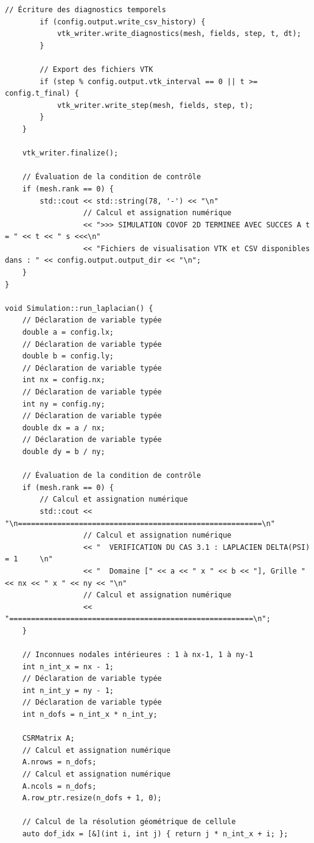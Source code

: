 \documentclass[10pt,a4paper,oneside]{book}
\begin{document}
\begin{lstlisting}[language={[11]C++}]
        // Écriture des diagnostics temporels
        if (config.output.write_csv_history) {
            vtk_writer.write_diagnostics(mesh, fields, step, t, dt);
        }

        // Export des fichiers VTK
        if (step % config.output.vtk_interval == 0 || t >= config.t_final) {
            vtk_writer.write_step(mesh, fields, step, t);
        }
    }

    vtk_writer.finalize();

    // Évaluation de la condition de contrôle
    if (mesh.rank == 0) {
        std::cout << std::string(78, '-') << "\n"
                  // Calcul et assignation numérique
                  << ">>> SIMULATION COVOF 2D TERMINEE AVEC SUCCES A t = " << t << " s <<<\n"
                  << "Fichiers de visualisation VTK et CSV disponibles dans : " << config.output.output_dir << "\n";
    }
}

void Simulation::run_laplacian() {
    // Déclaration de variable typée
    double a = config.lx;
    // Déclaration de variable typée
    double b = config.ly;
    // Déclaration de variable typée
    int nx = config.nx;
    // Déclaration de variable typée
    int ny = config.ny;
    // Déclaration de variable typée
    double dx = a / nx;
    // Déclaration de variable typée
    double dy = b / ny;

    // Évaluation de la condition de contrôle
    if (mesh.rank == 0) {
        // Calcul et assignation numérique
        std::cout << "\n========================================================\n"
                  // Calcul et assignation numérique
                  << "  VERIFICATION DU CAS 3.1 : LAPLACIEN DELTA(PSI) = 1     \n"
                  << "  Domaine [" << a << " x " << b << "], Grille " << nx << " x " << ny << "\n"
                  // Calcul et assignation numérique
                  << "========================================================\n";
    }

    // Inconnues nodales intérieures : 1 à nx-1, 1 à ny-1
    int n_int_x = nx - 1;
    // Déclaration de variable typée
    int n_int_y = ny - 1;
    // Déclaration de variable typée
    int n_dofs = n_int_x * n_int_y;

    CSRMatrix A;
    // Calcul et assignation numérique
    A.nrows = n_dofs;
    // Calcul et assignation numérique
    A.ncols = n_dofs;
    A.row_ptr.resize(n_dofs + 1, 0);

    // Calcul de la résolution géométrique de cellule
    auto dof_idx = [&](int i, int j) { return j * n_int_x + i; };


\end{lstlisting}
\end{document}
